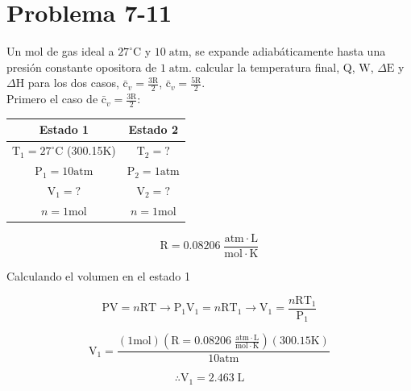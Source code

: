\documentclass[12pt]{article}
\begin{document}
\section*{Problema 7-11}
Un mol de gas ideal a $27^{\circ}\mathrm{C}$ y $10 \; \mathrm{atm}$, se expande adiabáticamente hasta una presión constante opositora de $1\;\mathrm{atm}$. calcular la temperatura final, $\mathrm{Q}$, $\mathrm{W}$, $\Delta\mathrm{E}$ y $\Delta\mathrm{H}$ para los dos casos, $\mathrm{\bar{c}}_v=\frac{3\mathrm{R}}{2}$, $\mathrm{\bar{c}}_v=\frac{5\mathrm{R}}{2}$.\\

Primero el caso de $\mathrm{\bar{c}}_v=\frac{3\mathrm{R}}{2}$:
\begin{center}
	\begin{tabular}{| c | c |}
		\hline
		Estado 1 &     Estado 2 \\ \hline
		$\mathrm{T}_1=27^{\circ}\mathrm{C}$\; (300.15$\mathrm{K}$) &    $\mathrm{T}_2=?$ \\
		$\mathrm{P}_1=10\mathrm{atm}$ &    $\mathrm{P}_2=1\mathrm{atm}$ \\
		$\mathrm{V}_1=?$ &    $\mathrm{V}_2=?$\\
		$n=1\mathrm{mol}$&    $n=1\mathrm{mol}$\\ \hline
	\end{tabular}

\begin{displaymath}
	\mathrm{R}=0.08206\; \frac{\mathrm{atm}\cdot\mathrm{L}}{\mathrm{mol}\cdot\mathrm{K}}
\end{displaymath}
\end{center}

Calculando el volumen en el estado 1

\begin{displaymath}
	\mathrm{P}\mathrm{V}=n\mathrm{R}\mathrm{T} \rightarrow \mathrm{P}_1\mathrm{V}_1=n\mathrm{R}\mathrm{T}_1 \rightarrow \mathrm{V}_1=\frac{n\mathrm{R}\mathrm{T}_1}{\mathrm{P}_1}
\end{displaymath}

\begin{displaymath}
	\mathrm{V}_1=\frac{(1\mathrm{mol})(	\mathrm{R}=0.08206\; \frac{\mathrm{atm}\cdot\mathrm{L}}{\mathrm{mol}\cdot\mathrm{K}})(300.15\mathrm{K})}{10\mathrm{atm}}
\end{displaymath}

\begin{displaymath}
	\therefore\mathrm{V}_1=2.463 \;\mathrm{L}
\end{displaymath}
\end{document}
